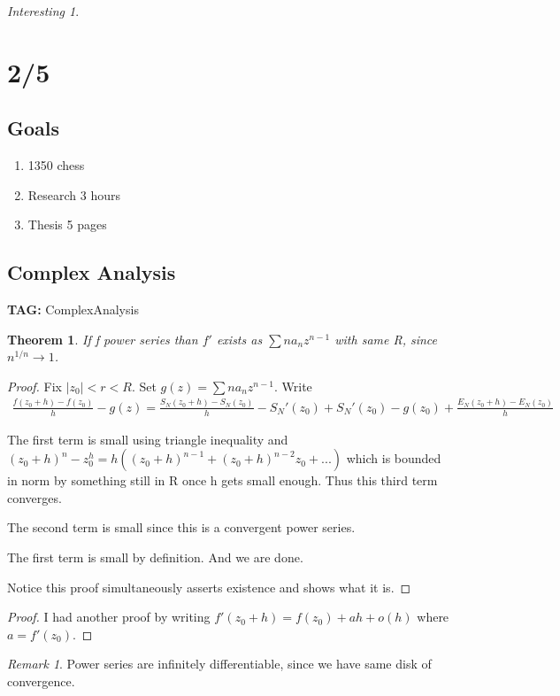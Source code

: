 \documentclass[11pt]{article}
\newtheorem{theorem}{Theorem}
\theoremstyle{remark}
\newtheorem{remark}{Remark}
\newtheorem{interest}{Interesting}
\begin{document}
\begin{interest}
\section{2/5}

\subsection{Goals}

\begin{enumerate}
	\item 1350 chess
	\item Research 3 hours
	\item Thesis 5 pages
\end{enumerate}

\subsection{Complex Analysis}

\textbf{TAG:} ComplexAnalysis

\begin{theorem}
	If f power series than $f'$ exists as $\sum n a_n z^{n-1}$ with same R, since $n^{1/n} \to 1$. 
\end{theorem}

\begin{proof}
	Fix $|z_0| < r < R$. Set $g(z) = \sum na_nz^{n-1}$. Write
	\begin{align*}
		\frac{f(z_0+h)-f(z_0)}{h} - g(z) = \frac{S_N(z_0+h)-S_N(z_0)}{h} - S_N'(z_0) + S_N'(z_0)-g(z_0) + \frac{E_N(z_0+h) - E_N(z_0)}{h}
	\end{align*}

	The first term is small using triangle inequality and $(z_0 + h)^n - z_0^h = h((z_0+h)^{n-1}+(z_0+h)^{n-2}z_0 + ...)$ which is bounded in norm by something still in R once h gets small enough. Thus this third term converges.

	The second term is small since this is a convergent power series.

	The first term is small by definition. And we are done.

	Notice this proof simultaneously asserts existence and shows what it is.
\end{proof}

\begin{proof}
	I had another proof by writing $f'(z_0 + h) = f(z_0) + ah + o(h)$ where $a = f'(z_0)$.
\end{proof}

\begin{remark}
	Power series are infinitely differentiable, since we have same disk of convergence. 
\end{remark}


\end{interest}
\end{document}
